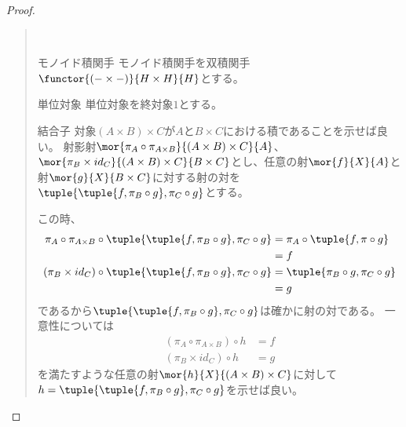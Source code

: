 \documentclass[uplatex,dvipdfmx]{jsarticle}
\begin{document}
  \begin{proof}
    \begin{quote}~
      \begin{mydescription}
        \item[モノイド積関手]
        モノイド積関手を双積関手$\functor{(-\times -)}{H\times H}{H}$とする。
        \item[単位対象]単位対象を終対象$1$とする。
        \item[結合子]対象$(A\times B)\times C$が$A$と$B\times C$における積であることを示せば良い。
        射影射$\mor{\pi_A\circ\pi_{A\times B}}{(A\times B)\times C}{A}$、$\mor{\pi_B\times id_C}{(A\times B)\times C}{B\times C}$とし、任意の射$\mor{f}{X}{A}$と射$\mor{g}{X}{B\times C}$に対する射の対を$\tuple{\tuple{f,\pi_B\circ g},\pi_C\circ g}$とする。
        \begin{center}
        \end{center}
        この時、
        \begin{align*}
          \pi_A\circ\pi_{A\times B}\circ\tuple{\tuple{f,\pi_B\circ g},\pi_C\circ g}&=\pi_A\circ\tuple{f,\pi\circ g}\\
          &=f\\
          (\pi_B\times id_C)\circ\tuple{\tuple{f,\pi_B\circ g},\pi_C\circ g}&=\tuple{\pi_B\circ g,\pi_C\circ g}\\
          &=g
        \end{align*}
        であるから$\tuple{\tuple{f,\pi_B\circ g},\pi_C\circ g}$は確かに射の対である。
        一意性については
        \begin{align*}
          (\pi_A\circ\pi_{A\times B})\circ h &= f\\
          (\pi_B\times id_C)\circ h &= g
        \end{align*}
        を満たすような任意の射$\mor{h}{X}{(A\times B)\times C}$に対して$h=\tuple{\tuple{f,\pi_B\circ g},\pi_C\circ g}$を示せば良い。


\end{mydescription}
\end{quote}
\end{proof}
\end{document}
